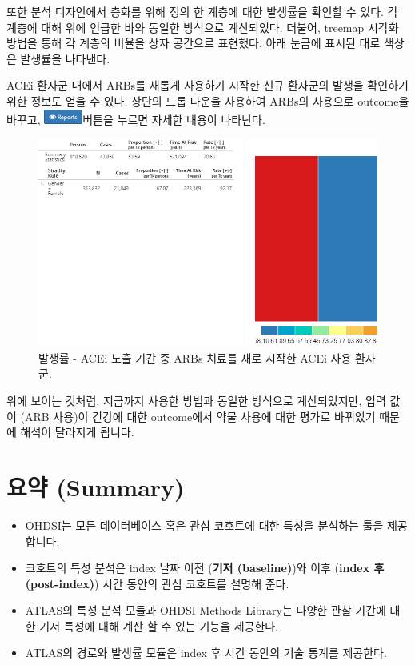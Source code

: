 \documentclass[11pt]{book}
\theoremstyle{definition}
\theoremstyle{definition}
\theoremstyle{definition}
\theoremstyle{remark}
\let\BeginKnitrBlock\begin \let\EndKnitrBlock\end
\begin{document}
또한 분석 디자인에서 층화를 위해 정의 한 계층에 대한 발생률을 확인할 수
있다. 각 계층에 대해 위에 언급한 바와 동일한 방식으로 계산되었다.
더불어, treemap 시각화 방법을 통해 각 계층의 비율을 상자 공간으로
표현했다. 아래 눈금에 표시된 대로 색상은 발생률을 나타낸다.

ACEi 환자군 내에서 ARBs를 새롭게 사용하기 시작한 신규 환자군의 발생을
확인하기 위한 정보도 얻을 수 있다. 상단의 드롭 다운을 사용하여 ARBs의
사용으로 outcome을 바꾸고,
\includegraphics{images/Characterization/atlasIncidenceReportButton.png}버튼을
누르면 자세한 내용이 나타난다.

\begin{figure}

{\centering \includegraphics[width=1\linewidth]{images/Characterization/atlasIncidenceResultsARB} 

}

\caption{발생률 - ACEi 노출 기간 중 ARBs 치료를 새로 시작한 ACEi 사용 환자군.}\label{fig:atlasIncidenceResultsARB}
\end{figure}

위에 보이는 것처럼, 지금까지 사용한 방법과 동일한 방식으로 계산되었지만,
입력 값이 (ARB 사용)이 건강에 대한 outcome에서 약물 사용에 대한 평가로
바뀌었기 때문에 해석이 달라지게 됩니다.

\section{요약 (Summary)}\label{-summary}

\BeginKnitrBlock{rmdsummary}
\begin{itemize}
\item
  OHDSI는 모든 데이터베이스 혹은 관심 코호트에 대한 특성을 분석하는 툴을
  제공합니다.
\item
  코호트의 특성 분석은 index 날짜 이전 (\textbf{기저 (baseline)})와 이후
  (\textbf{index 후 (post-index)}) 시간 동안의 관심 코호트를 설명해
  준다.
\item
  ATLAS의 특성 분석 모듈과 OHDSI Methods Library는 다양한 관찰 기간에
  대한 기저 특성에 대해 계산 할 수 있는 기능을 제공한다.
\item
  ATLAS의 경로와 발생률 모듈은 index 후 시간 동안의 기술 통계를
  제공한다.
\end{itemize}
\EndKnitrBlock{rmdsummary}
\end{document}
